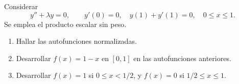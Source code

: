 Considerar
\[y''+\lambda y=0,\qquad y'(0)=0,\quad y(1)+y'(1)=0,\quad 0\le x\le1.\]
Se emplea el producto escalar sin peso.

\begin{enumerate}[label=(\alph*),ref=\alph*,leftmargin=*]
\item Hallar las autofunciones normalizadas.
\item Desarrollar \(f(x)=1-x\) en \([0,1]\) en las autofunciones anteriores.
\item Desarrollar \(f(x)=1\) si \(0\le x<1/2\), y \(f(x)=0\) si \(1/2\le x\le1\).
\end{enumerate}
